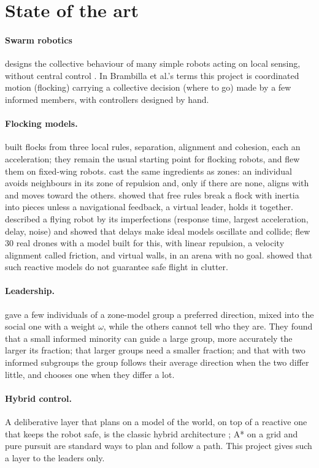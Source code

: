 \section{State of the art}
\label{sec:background}

\paragraph{Swarm robotics} designs the collective behaviour of many simple
robots acting on local sensing, without central control
\citep{brambilla2013}. In Brambilla et al.'s terms this project is
coordinated motion (flocking) carrying a collective decision (where to go)
made by a few informed members, with controllers designed by hand.

\paragraph{Flocking models.} \citet{reynolds1987} built flocks from three
local rules, separation, alignment and cohesion, each an acceleration; they
remain the usual starting point for flocking robots, and \citet{hauert2011}
flew them on fixed-wing robots. \citet{couzin2002} cast the same ingredients
as zones: an individual avoids neighbours in its zone of repulsion and,
only if there are none, aligns with and moves toward the others.
\citet{olfatisaber2006} showed that free rules break a flock with inertia
into pieces unless a navigational feedback, a virtual leader, holds it
together. \citet{viragh2014} described a flying robot by its imperfections
(response time, largest acceleration, delay, noise) and showed that delays
make ideal models oscillate and collide; \citet{vasarhelyi2018} flew 30 real
drones with a model built for this, with linear repulsion, a velocity
alignment called friction, and virtual walls, in an arena with no goal.
\citet{soria2021} showed that such reactive models do not guarantee safe
flight in clutter.

\paragraph{Leadership.} \citet{couzin2005} gave a few individuals of a
zone-model group a preferred direction, mixed into the social one with a
weight $\omega$, while the others cannot tell who they are. They found that a
small informed minority can guide a large group, more accurately the larger
its fraction; that larger groups need a smaller fraction; and that with two
informed subgroups the group follows their average direction when the two
differ little, and chooses one when they differ a lot.

\paragraph{Hybrid control.} A deliberative layer that plans on a model of the
world, on top of a reactive one that keeps the robot safe, is the classic
hybrid architecture \citep{arkin1998}; A* on a grid \citep{hart1968} and pure
pursuit \citep{coulter1992} are standard ways to plan and follow a path. This
project gives such a layer to the leaders only.

